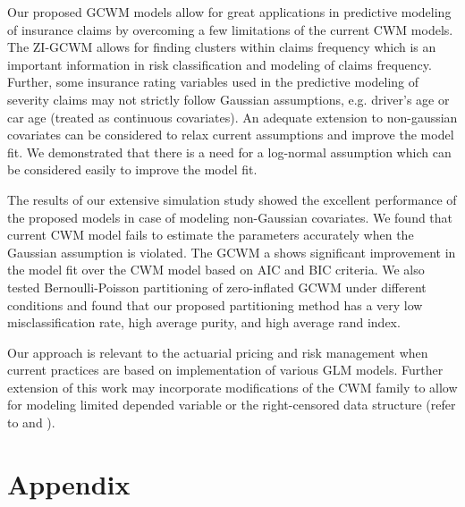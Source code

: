 \documentclass[11pt,letterpaper]{article}
\numberwithin{equation}{section}
\numberwithin{equation}{section}
\numberwithin{equation}{section}
\begin{document}
Our proposed GCWM models allow for great applications in predictive modeling of insurance claims by overcoming a few limitations of the current CWM models. The ZI-GCWM allows for finding clusters within claims frequency which is an important information in risk classification and modeling of claims frequency. Further, some insurance rating variables used in the predictive modeling of severity claims may not strictly follow Gaussian assumptions, e.g. driver's age or car age (treated as continuous covariates). An adequate extension to non-gaussian covariates can be considered to relax current assumptions and improve the model fit. We demonstrated that there is a need for a log-normal assumption which can be considered easily to improve the model fit.

The results of our extensive simulation study showed the excellent performance of the proposed models in case of modeling non-Gaussian covariates. We found  that current CWM model fails to estimate the parameters accurately when the Gaussian assumption is violated. The GCWM a shows significant improvement in the model fit over the CWM model based on AIC and BIC criteria. We also tested Bernoulli-Poisson partitioning of zero-inflated GCWM under different conditions and found that our proposed partitioning method has a very low misclassification rate, high average purity, and high average rand index.

Our approach is relevant to the actuarial pricing and risk management when current practices are based on implementation of various GLM models. Further extension of this work may incorporate modifications of the CWM family to allow for modeling limited depended variable or the right-censored data structure (refer to \cite{miljkovic2015} and \cite{miljkovic+orr:2017}).



\newpage
\section{Appendix}
\end{document}

